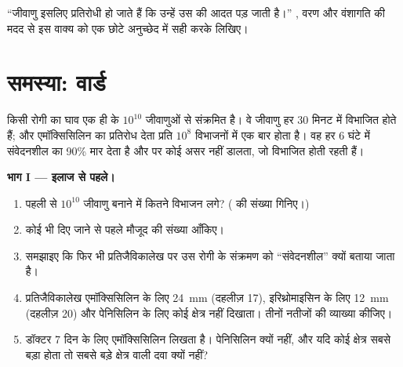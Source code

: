 \begin{exercise}[$\star\star\star$]\label{exo:g11:antibiotic-resistance:15}
``जीवाणु इसलिए प्रतिरोधी हो जाते हैं कि उन्हें उस  की आदत पड़
जाती है।'' , वरण और वंशागति की मदद से इस वाक्य को एक छोटे
अनुच्छेद में सही करके लिखिए।
\end{exercise}

\section{समस्या: वार्ड}

\begin{problem}[{सप्ताहांत समस्या --- किसी अस्पताल वार्ड का प्रकोप अकेली
एक उत्परिवर्ती कोशिका से पीछा किया गया: किसी कॉलोनी का गणित, पढ़ा गया एक
प्रतिजैविकालेख, बीच में रोका गया एक कोर्स, और वह नीति जो फैलाव रोक देती
है}]
\label{pb:g11:antibiotic-resistance:1}
किसी रोगी का घाव एक ही  के $10^{10}$ जीवाणुओं से संक्रमित है। वे
जीवाणु हर 30 मिनट में विभाजित होते हैं; और  एमॉक्सिसिलिन का
प्रतिरोध देता  प्रति $10^8$ विभाजनों में एक बार होता है। वह
 हर 6 घंटे में संवेदनशील  का 90\% मार देता है और
  पर कोई असर नहीं डालता, जो विभाजित होती रहती हैं।

\medskip
\noindent\textbf{भाग I --- इलाज से पहले।}
\begin{enumerate}
  \item पहली  से $10^{10}$ जीवाणु बनाने में कितने विभाजन लगे?
        ( की संख्या गिनिए।)
  \item कोई भी  दिए जाने से पहले मौजूद   की
        संख्या आँकिए।
  \item समझाइए कि फिर भी प्रतिजैविकालेख पर उस रोगी के संक्रमण को
        ``संवेदनशील'' क्यों बताया जाता है।
  \item प्रतिजैविकालेख एमॉक्सिसिलिन के लिए \qty{24}{mm} (दहलीज़ 17),
        इरिथ्रोमाइसिन के लिए \qty{12}{mm} (दहलीज़ 20) और पेनिसिलिन के लिए
        कोई क्षेत्र नहीं दिखाता। तीनों नतीजों की व्याख्या कीजिए।
  \item डॉक्टर 7 दिन के लिए एमॉक्सिसिलिन लिखता है। पेनिसिलिन क्यों नहीं,
        और यदि कोई क्षेत्र सबसे बड़ा होता तो सबसे बड़े क्षेत्र वाली दवा
        क्यों नहीं?
\end{enumerate}


\end{problem}
